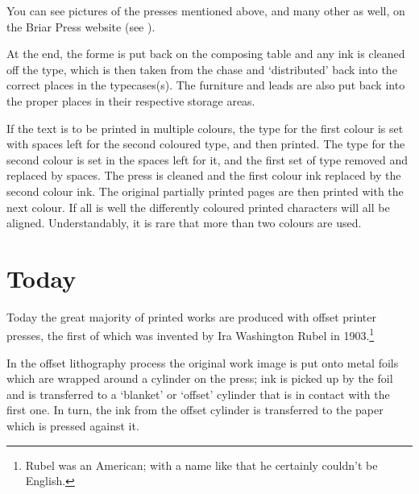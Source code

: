 \documentclass[10pt,letterpaper,extrafontsizes]{memoir}
\begin{document}
    You can see pictures of the presses mentioned above, and many other as 
well, on the 
Briar Press website (see ).

    At the end, the forme is put back on the composing table and any ink 
is cleaned off the type, which is then taken from the chase 
and `distributed' back into
the correct places in the typecases(s). The furniture and
leads are also put back into the proper places in their respective
storage areas.

    If the text is to be printed in multiple colours, the type for the first
colour is set with spaces left for the second coloured type, and then printed.
The type for the second colour is set in the spaces left for it, and the first
set of type removed and replaced by spaces. The press is cleaned and the first
colour ink replaced by the second colour ink. The original partially printed
pages are then printed with the next colour. If all is well the differently
coloured printed characters will all be aligned. Understandably, it is rare 
that more than two colours are used.

 
\section{Today}

    Today the great majority of printed works are produced with 
offset printer presses, the first of which was
invented by Ira Washington Rubel in 
1903.\footnote{Rubel was an American; with a name like that he certainly
couldn't be English.}

    In the offset lithography process the original work image is put 
onto metal foils which 
are wrapped around a cylinder on the press; ink is picked up by the foil 
and is transferred to a `blanket' or `offset' cylinder that is in contact
with the first one. In turn, the ink from the offset cylinder is 
transferred to the paper which is pressed against it.
\end{document}
